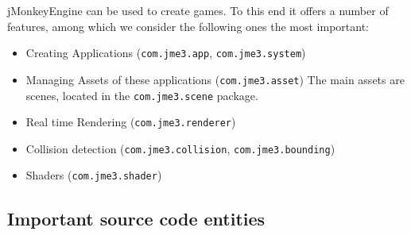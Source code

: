 \documentclass[a4paper, 10pt]{article}
\begin{document}
jMonkeyEngine can be used to create games. To this end it offers a
number of features, among which we consider the following ones the
most important:
\begin{itemize}
	\item Creating Applications 
	(\verb|com.jme3.app|, \verb|com.jme3.system|)
	\item Managing Assets of these applications (\verb|com.jme3.asset|)
	The main assets are scenes, 
	located in the \verb|com.jme3.scene| package.
	
	\item Real time Rendering (\verb|com.jme3.renderer|)
	\item Collision detection (\verb|com.jme3.collision|, \verb|com.jme3.bounding|)
	\item Shaders (\verb|com.jme3.shader|)
\end{itemize}


\subsection{Important source code entities}
\label{sec:important_src_entities}
\end{document}
